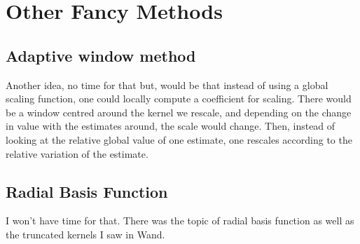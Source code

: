 \section{Other Fancy Methods}

\subsection{Adaptive window method}
Another idea, no time for that but, would be that instead of using a global scaling function, one could locally compute a coefficient for scaling. There would be a window centred around the kernel we rescale, and depending on the change in value with the estimates around, the scale would change. Then, instead of looking at the relative global value of one estimate, one rescales according to the relative variation of the estimate.

\subsection{Radial Basis Function}

I won't have time for that. There was the topic of radial basis function as well as the truncated kernels I saw in Wand. 









